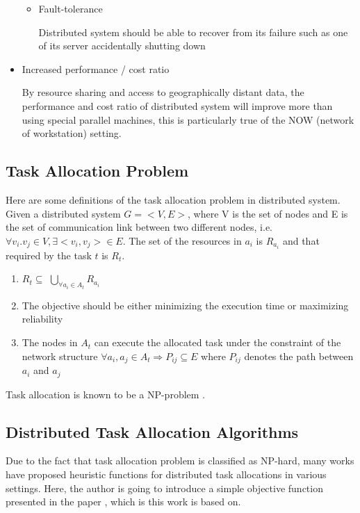 \begin{itemize}
\begin{itemize}
      	\item{Fault-tolerance}
	
	Distributed system should be able to recover from its failure such as one of its server accidentally shutting down
	
    \end{itemize}
    
    
   \item{Increased performance / cost ratio}
   
     By resource sharing and access to geographically distant data, the performance and cost ratio of distributed system will improve more than using special parallel machines, this is particularly true of the NOW (network of workstation) setting.
     
\end{itemize}

\subsection{Task Allocation Problem}

Here are some definitions of the task allocation problem in distributed system. \cite{definition}
Given a distributed system $G = <V, E>$, where V is the set of nodes and E is the set of communication link between two different nodes, i.e. $\forall v_i. v_j \in V, \exists <v_i, v_j> \in E$.  The set of the resources in $a_i$ is $R_{a_i}$ and that required by the task $t$ is $R_t$.

\begin{enumerate}
	\item{$R_t \subseteq$ $\bigcup_{\forall a_i \in A_t} R_{a_i}$}
	\item{The objective should be either minimizing the execution time \cite{time} or maximizing reliability \cite{reliability}}
	\item{The nodes in $A_t$ can execute the allocated task under the constraint of the network structure $\forall a_i, a_j \in A_t \Rightarrow P_{ij} \subseteq E$ where $P_{ij}$ denotes the path between $a_i$ and $a_j$}
\end{enumerate}

Task allocation is known to be a NP-problem \cite{np}.

\subsection{Distributed Task Allocation Algorithms}

Due to the fact that task allocation problem is classified as NP-hard, many works have proposed heuristic functions for distributed task allocations in various settings.  Here, the author is going to introduce a simple objective function presented in the paper \cite{algorithm}, which is this work is based on.

